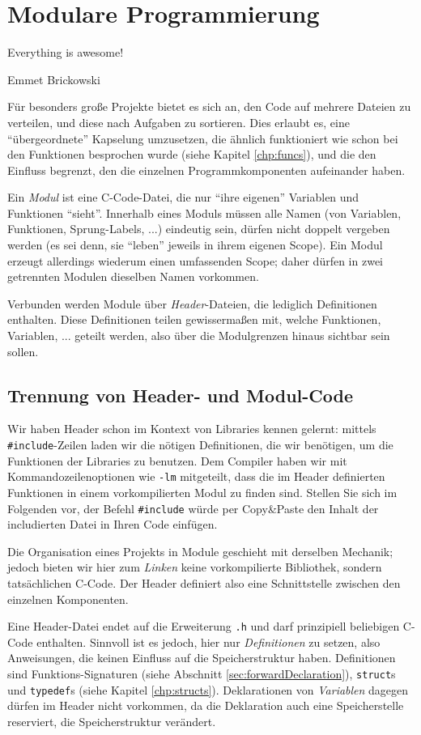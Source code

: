 \chapter{Modulare Programmierung}\label{chp:modules}
\epigraph{Everything is awesome!}{Emmet Brickowski}

Für besonders große Projekte bietet es sich an, den Code auf mehrere Dateien zu verteilen, und diese nach Aufgaben zu sortieren. Dies erlaubt es, eine \enquote{übergeordnete} Kapselung umzusetzen, die ähnlich funktioniert wie schon bei den Funktionen besprochen wurde (siehe Kapitel \ref{chp:funcs}), und die den Einfluss begrenzt, den die einzelnen Programmkomponenten aufeinander haben.

Ein \emph{Modul} ist eine C-Code-Datei, die nur \enquote{ihre eigenen} Variablen und Funktionen \enquote{sieht}. Innerhalb eines Moduls müssen alle Namen (von Variablen, Funktionen, Sprung-Labels, ...) eindeutig sein, \ie dürfen nicht doppelt vergeben werden (es sei denn, sie \enquote{leben} jeweils in ihrem eigenen Scope). Ein Modul erzeugt allerdings wiederum einen umfassenden Scope; daher dürfen in zwei getrennten Modulen dieselben Namen vorkommen.

Verbunden werden Module über \emph{Header}-Dateien, die lediglich Definitionen enthalten. Diese Definitionen teilen gewissermaßen mit, welche Funktionen, Variablen, ... geteilt werden, also über die Modulgrenzen hinaus sichtbar sein sollen.

\section{Trennung von Header- und Modul-Code}
Wir haben Header schon im Kontext von Libraries kennen gelernt: mittels \texttt{#include}-Zeilen laden wir die nötigen Definitionen, die wir benötigen, um die Funktionen der Libraries zu benutzen. Dem Compiler haben wir mit Kommandozeilenoptionen wie \texttt{-lm} mitgeteilt, dass die im Header definierten Funktionen in einem vorkompilierten Modul zu finden sind. Stellen Sie sich im Folgenden vor, der Befehl \texttt{#include} würde per Copy\&Paste den Inhalt der includierten Datei in Ihren Code einfügen.

Die Organisation eines Projekts in Module geschieht mit derselben Mechanik; jedoch bieten wir hier zum \emph{Linken} keine vorkompilierte Bibliothek, sondern tatsächlichen C-Code. Der Header definiert also eine Schnittstelle zwischen den einzelnen Komponenten.

Eine Header-Datei endet auf die Erweiterung \texttt{.h} und darf prinzipiell beliebigen C-Code enthalten. Sinnvoll ist es jedoch, hier nur \emph{Definitionen} zu setzen, also Anweisungen, die keinen Einfluss auf die Speicherstruktur haben. Definitionen sind \eg Funktions-Signaturen (siehe Abschnitt \ref{sec:forwardDeclaration}), \texttt{struct}s und \texttt{typedef}s (siehe Kapitel \ref{chp:structs}). Deklarationen von \emph{Variablen} dagegen dürfen im Header nicht vorkommen, da die Deklaration auch eine Speicherstelle reserviert, \ie die Speicherstruktur verändert.

